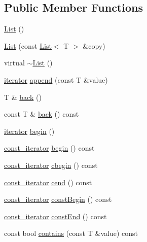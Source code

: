 \subsection*{Public Member Functions}
\begin{DoxyCompactItemize}
\item 
\hyperlink{classprism_1_1_list_af81334fa20cb34b36a40d0ac4c36e2a5}{List} ()
\item 
\hyperlink{classprism_1_1_list_a8f2ff5a39c10ca4f57b5d3794e72cf93}{List} (const \hyperlink{classprism_1_1_list}{List}$<$ T $>$ \&copy)
\item 
virtual \hyperlink{classprism_1_1_list_aaa8567cc4eb408e62117f1a9782629ba}{$\sim$\+List} ()
\item 
\hyperlink{classprism_1_1_list_a6cf00c98a428ed325fe9ccc60d7ef95a}{iterator} \hyperlink{classprism_1_1_list_a5e6584f87eee4371e308e1aa9c3da6c8}{append} (const T \&value)
\item 
T \& \hyperlink{classprism_1_1_list_a557466129db60dc92eaa68b18012900e}{back} ()
\item 
const T \& \hyperlink{classprism_1_1_list_a6031d94f7c8a88224364523d10a2eff4}{back} () const 
\item 
\hyperlink{classprism_1_1_list_a6cf00c98a428ed325fe9ccc60d7ef95a}{iterator} \hyperlink{classprism_1_1_list_ac86cc19f89e9913ea93f3b212d531954}{begin} ()
\item 
\hyperlink{classprism_1_1_list_a038bd36af263a85110467528db8305d5}{const\+\_\+iterator} \hyperlink{classprism_1_1_list_a9d4e4d463be411b27307dcf3cdc49422}{begin} () const 
\item 
\hyperlink{classprism_1_1_list_a038bd36af263a85110467528db8305d5}{const\+\_\+iterator} \hyperlink{classprism_1_1_list_a55b460a5a5e00aeee87df83e8559349c}{cbegin} () const 
\item 
\hyperlink{classprism_1_1_list_a038bd36af263a85110467528db8305d5}{const\+\_\+iterator} \hyperlink{classprism_1_1_list_a1b526719a7f63a47482ff0b293d36ad1}{cend} () const 
\item 
\hyperlink{classprism_1_1_list_a038bd36af263a85110467528db8305d5}{const\+\_\+iterator} \hyperlink{classprism_1_1_list_a19923a3ef18676b387972dcb78f5a131}{const\+Begin} () const 
\item 
\hyperlink{classprism_1_1_list_a038bd36af263a85110467528db8305d5}{const\+\_\+iterator} \hyperlink{classprism_1_1_list_af8f11fb293ac9961acf72e76c4128473}{const\+End} () const 
\item 
const bool \hyperlink{classprism_1_1_list_a3b6d05cd9d1911861c7a440c291ccc26}{contains} (const T \&value) const 

\end{DoxyCompactItemize}
